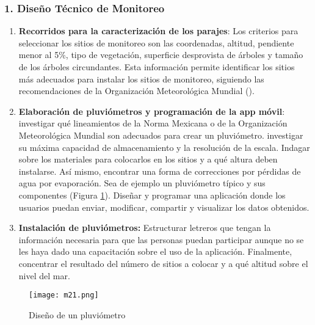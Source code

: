 \subsubsection{1. Diseño Técnico de Monitoreo}

\begin{enumerate}
    \item \textbf{Recorridos para la caracterización de los parajes}: Los criterios para seleccionar los sitios de monitoreo son las coordenadas, altitud, pendiente menor al 5\%, tipo de vegetación, superficie desprovista de árboles y tamaño de los árboles circundantes. Esta información permite identificar los sitios más adecuados para instalar los sitios de monitoreo, siguiendo las recomendaciones de la Organización Meteorológica Mundial (\cite{WMO2014}). 
 
    \item \textbf{Elaboración de pluviómetros y programación de la app móvil}: investigar qué lineamientos de la Norma Mexicana o de la Organización Meteorológica Mundial son adecuados para crear un pluviómetro. investigar su máxima capacidad de almacenamiento y la resolución de la escala. Indagar sobre los materiales para colocarlos en los sitios y a qué altura deben instalarse. Así mismo, encontrar una forma de correcciones por pérdidas de agua por evaporación. Sea de ejemplo un pluviómetro típico y sus componentes (Figura \ref{m21}). Diseñar y programar una aplicación donde los usuarios puedan enviar, modificar, compartir y visualizar los datos obtenidos.

    \item \textbf{Instalación de pluviómetros:} Estructurar letreros que tengan la información necesaria para que las personas puedan participar aunque no se les haya dado una capacitación sobre el uso de la aplicación. Finalmente, concentrar el resultado del número de sitios a colocar y a qué altitud sobre el nivel del mar. 
\end{enumerate}


\begin{figure}[h!]
\centering
  \texttt{[image: m21.png]}
  \caption{Diseño de un pluviómetro}
  \label{m21}
\end{figure}






\newpage


